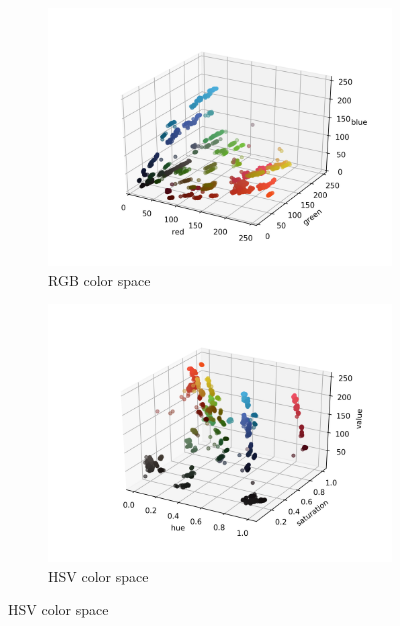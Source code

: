 \documentclass[12pt,a4paper]{article}
\begin{document}
	
	\begin{center}
		\begin{figure}[H]
			\begin{subfigure}{.5\linewidth}
				\includegraphics[width=\linewidth]{images/rgb.png}
				\caption{RGB color space}
			\end{subfigure}
			\begin{subfigure}{.5\linewidth}
				\includegraphics[width=\linewidth]{images/hsv.png}
				\caption{HSV color space}
			\end{subfigure}
		\end{figure}
	\end{center}
\end{document}
